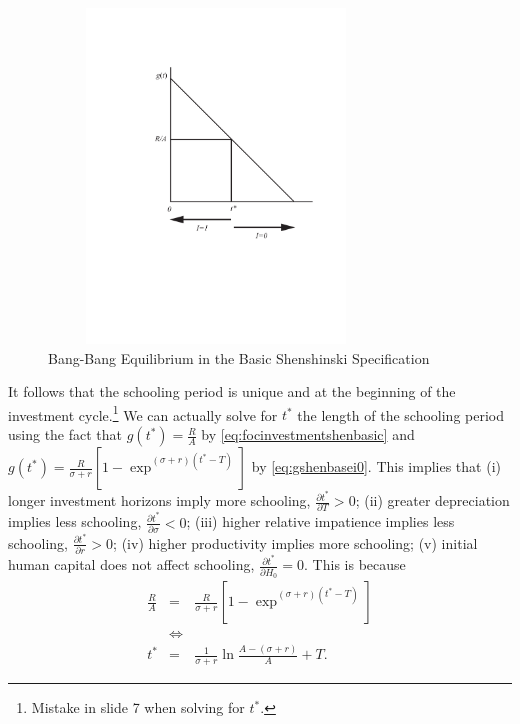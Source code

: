 \begin{center}
\begin{figure}[H]
\caption{Bang-Bang Equilibrium in the Basic Shenshinski Specification}
\centering
\includegraphics[width=3.5in, height=3.5in]{Figures/fig-shesh-rule.pdf}
\end{figure}
\end{center}

\indent It follows that the schooling period is unique and at the beginning of the investment cycle.\footnote{Mistake in slide 7 when solving for $t^*$.} We can actually solve for $t^*$ the length of the schooling period using the fact that $g(t^*) = \frac{R}{A} $ by \eqref{eq:focinvestmentshenbasic} and $g(t^*) = \frac{R}{\sigma + r} \left[1 - \exp^{(\sigma + r)(t^*-T)} \right]$ by \eqref{eq:gshenbasei0}. This implies that (i) longer investment horizons imply more schooling, $\frac{\partial t^*}{\partial T} > 0$; (ii) greater depreciation implies less schooling, $\frac{\partial t^*}{\partial \sigma} < 0$; (iii) higher relative impatience implies less schooling, $\frac{\partial t^*}{\partial r} > 0$; (iv) higher productivity implies more schooling; (v) initial human capital does not affect schooling, $\frac{\partial t^*}{\partial H_{0}} = 0$. This is because
\begin{eqnarray}
\frac{R}{A} &=& \frac{R}{\sigma + r} \left[1 - \exp^{(\sigma + r)(t^*-T)} \right] \nonumber \\
&\Leftrightarrow& \nonumber \\ 
t^* &=& \frac{1}{\sigma + r} \ln \frac{A - (\sigma + r) }{A} + T.
\end{eqnarray}

